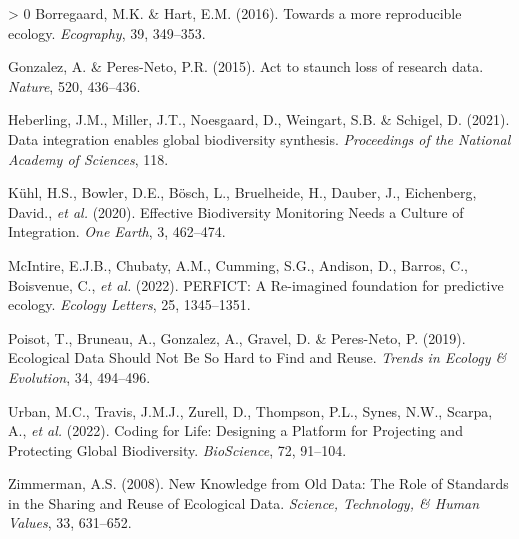 \documentclass[11pt]{article}
\newlength{\cslhangindent}
\newenvironment{CSLReferences}[3] %
 {%
  \setlength{\parindent}{0pt}
  \ifodd #1 \everypar{\setlength{\hangindent}{\cslhangindent}}\ignorespaces\fi
  \ifnum #2 > 0
  \setlength{\parskip}{#2\baselineskip}
  \fi
 }%
 {}
\begin{document}
\hypertarget{refs}{}
\begin{CSLReferences}{1}{0}
\leavevmode\hypertarget{ref-Borregaard2016MorRep}{}%
Borregaard, M.K. \& Hart, E.M. (2016). Towards a more reproducible
ecology. \emph{Ecography}, 39, 349--353.

\leavevmode\hypertarget{ref-Gonzalez2015ActSta}{}%
Gonzalez, A. \& Peres-Neto, P.R. (2015). Act to staunch loss of research
data. \emph{Nature}, 520, 436--436.

\leavevmode\hypertarget{ref-Heberling2021DatInt}{}%
Heberling, J.M., Miller, J.T., Noesgaard, D., Weingart, S.B. \& Schigel,
D. (2021). Data integration enables global biodiversity synthesis.
\emph{Proceedings of the National Academy of Sciences}, 118.

\leavevmode\hypertarget{ref-Kuhl2020EffBio}{}%
Kühl, H.S., Bowler, D.E., Bösch, L., Bruelheide, H., Dauber, J.,
Eichenberg, David., \emph{et al.} (2020). Effective Biodiversity
Monitoring Needs a Culture of Integration. \emph{One Earth}, 3,
462--474.

\leavevmode\hypertarget{ref-McIntire2022PerRei}{}%
McIntire, E.J.B., Chubaty, A.M., Cumming, S.G., Andison, D., Barros, C.,
Boisvenue, C., \emph{et al.} (2022). PERFICT: A Re-imagined foundation
for predictive ecology. \emph{Ecology Letters}, 25, 1345--1351.

\leavevmode\hypertarget{ref-Poisot2019EcoDat}{}%
Poisot, T., Bruneau, A., Gonzalez, A., Gravel, D. \& Peres-Neto, P.
(2019). Ecological Data Should Not Be So Hard to Find and Reuse.
\emph{Trends in Ecology \& Evolution}, 34, 494--496.

\leavevmode\hypertarget{ref-Urban2022CodLif}{}%
Urban, M.C., Travis, J.M.J., Zurell, D., Thompson, P.L., Synes, N.W.,
Scarpa, A., \emph{et al.} (2022). Coding for Life: Designing a Platform
for Projecting and Protecting Global Biodiversity. \emph{BioScience},
72, 91--104.

\leavevmode\hypertarget{ref-Zimmerman2008NewKno}{}%
Zimmerman, A.S. (2008). New Knowledge from Old Data: The Role of
Standards in the Sharing and Reuse of Ecological Data. \emph{Science,
Technology, \& Human Values}, 33, 631--652.

\end{CSLReferences}
\end{document}
